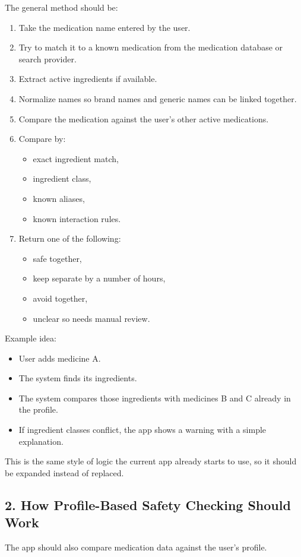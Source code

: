 \documentclass[11pt,a4paper]{article}
\begin{document}
The general method should be:
\begin{enumerate}
    \item Take the medication name entered by the user.
    \item Try to match it to a known medication from the medication database or search provider.
    \item Extract active ingredients if available.
    \item Normalize names so brand names and generic names can be linked together.
    \item Compare the medication against the user's other active medications.
    \item Compare by:
    \begin{itemize}
        \item exact ingredient match,
        \item ingredient class,
        \item known aliases,
        \item known interaction rules.
    \end{itemize}
    \item Return one of the following:
    \begin{itemize}
        \item safe together,
        \item keep separate by a number of hours,
        \item avoid together,
        \item unclear so needs manual review.
    \end{itemize}
\end{enumerate}

Example idea:
\begin{itemize}
    \item User adds medicine A.
    \item The system finds its ingredients.
    \item The system compares those ingredients with medicines B and C already in the profile.
    \item If ingredient classes conflict, the app shows a warning with a simple explanation.
\end{itemize}

This is the same style of logic the current app already starts to use, so it should be expanded instead of replaced.

\subsection{2. How Profile-Based Safety Checking Should Work}
The app should also compare medication data against the user's profile.
\end{document}

